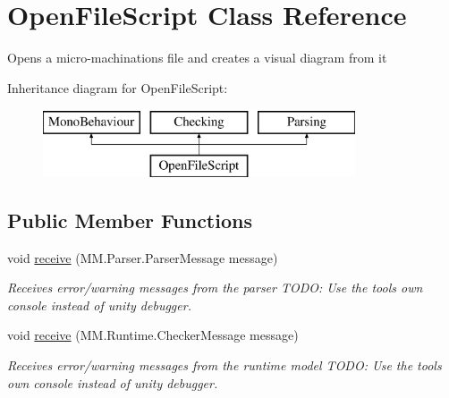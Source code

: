 \hypertarget{class_open_file_script}{}\section{Open\+File\+Script Class Reference}
\label{class_open_file_script}


Opens a micro-\/machinations file and creates a visual diagram from it  


Inheritance diagram for Open\+File\+Script\+:\begin{figure}[H]
\begin{center}
\leavevmode
\includegraphics[height=2.000000cm]{class_open_file_script}
\end{center}
\end{figure}
\subsection*{Public Member Functions}
\begin{DoxyCompactItemize}
\item 
void \hyperlink{class_open_file_script_a94b7ce5bc20da9a8be4322c1eb53fd75}{receive} (M\+M.\+Parser.\+Parser\+Message message)
\begin{DoxyCompactList}\small\item\em Receives error/warning messages from the parser T\+O\+DO\+: Use the tools own console instead of unity debugger. \end{DoxyCompactList}\item 
void \hyperlink{class_open_file_script_aa2396d19a7620be7dd7e327865fc9501}{receive} (M\+M.\+Runtime.\+Checker\+Message message)
\begin{DoxyCompactList}\small\item\em Receives error/warning messages from the runtime model T\+O\+DO\+: Use the tools own console instead of unity debugger. \end{DoxyCompactList}\end{DoxyCompactItemize}
